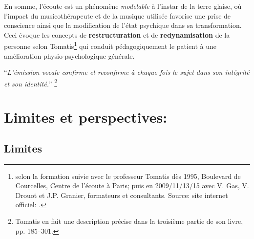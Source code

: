   

En somme, l'écoute est un phénomène \textit{modelable} à l'instar de
la terre glaise, où l'impact du musicothérapeute et de la musique utilisée favorise une prise de
conscience ainsi que la modification
de  l'état psychique dans sa transformation.
Ceci évoque les concepts de \textbf{restructuration }et de
\textbf{redynamisation} de la personne selon Tomatis\footnote{selon la formation
   suivie avec le professeur Tomatis dès 1995, Boulevard de Courcelles, Centre de l'écoute à Paris; puis en 2009/11/13/15 avec V. Gas, V. Drouot et
J.P. Granier, formateurs et consultants. Source: site internet
officiel: \cite{tomatis.com}.}
qui conduit pédagogiquement le patient à une amélioration physio-psychologique
générale.

\enquote{\emph{L'émission vocale confirme et reconfirme à chaque
fois le sujet dans son intégrité et son identité.}}%
\autocite{tomatis:loreille}\footnote{Tomatis en fait une description précise dans la troisième partie de
son livre, pp. 185--301.}










  \section{Limites et perspectives: }

\subsection{Limites}



